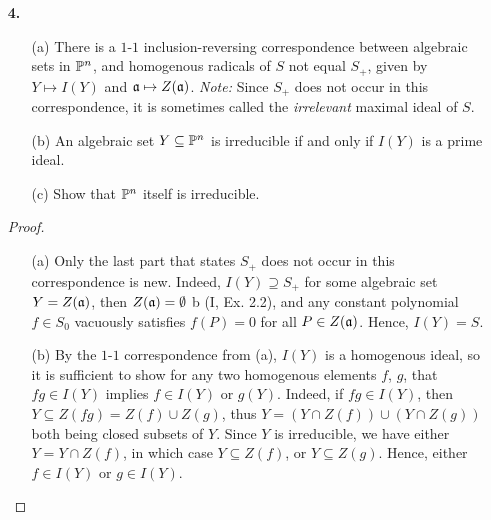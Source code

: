 \documentclass{article}
\begin{document}
\begin{enumerate} [label=\textbf{\arabic*.}, leftmargin=0cm]
\begin{proof}
    (iii) $\implies$ (i) Let $d > 0$ be the smallest integer such that $\goth{a} \supseteq S_d$, then we have $\goth{a} \supseteq \bigoplus_{l \geq d} S_l$ so that $x_i^l \in \goth{a}$ for all $0 \leq i \leq n$ and $l \geq d$.
    If there exists $P = (a_0, \dots, a_n) \in Z(\goth{a})$, then $a_i^d = a_i^{d + 1} = 0$, which implies $a_i = 0$ for all $0 \leq i \leq n$, which is impossible.
\end{proof}

\item[\textbf{4.}] \begin{itemize}
    \item[(a)] There is a $1$-$1$ inclusion-reversing correspondence between algebraic sets in $\mathbb{P}^n$, and homogenous radicals of $S$ not equal $S_+$, given by $Y \mapsto I(Y)$ and $\mathfrak{a} \mapsto Z(\mathfrak{a})$.
    \textit{Note:} Since $S_+$ does not occur in this correspondence, it is sometimes called the \textit{irrelevant} maximal ideal of $S$.

    \item[(b)] An algebraic set $Y \subseteq \mathbb{P}^n$ is irreducible if and only if $I(Y)$ is a prime ideal.

    \item[(c)] Show that $\mathbb{P}^n$ itself is irreducible.
\end{itemize}

\begin{proof} $ $ \vspace{0pt}
    \begin{itemize} [leftmargin=0cm]
        \item[(a)] Only the last part that states $S_+$ does not occur in this correspondence is new. Indeed, $I(Y) \supseteq S_+$ for some algebraic set $Y = Z(\mathfrak{a})$, then $Z(\mathfrak{a}) = \emptyset$ b (I, Ex. 2.2), and any constant polynomial $f \in S_0$ vacuously satisfies $f(P) = 0$ for all $P \in Z(\mathfrak{a})$. Hence, $I(Y) = S$.

        \item[(b)] By the $1$-$1$ correspondence from (a), $I(Y)$ is a homogenous ideal, so it is sufficient to show for any two homogenous elements $f$, $g$, that $fg \in I(Y)$ implies $f \in I(Y)$ or $g(Y)$. Indeed, if $fg \in I(Y)$, then $Y \subseteq Z(fg) = Z(f) \cup Z(g)$, thus $Y = (Y \cap Z(f)) \cup (Y \cap Z(g))$ both being closed subsets of $Y$. Since $Y$ is irreducible, we have either $Y = Y \cap Z(f)$, in which case $Y \subseteq Z(f)$, or $Y \subseteq Z(g)$. Hence, either $f \in I(Y)$ or $g \in I(Y)$.


\end{itemize}
\end{proof}
\end{enumerate}
\end{document}
